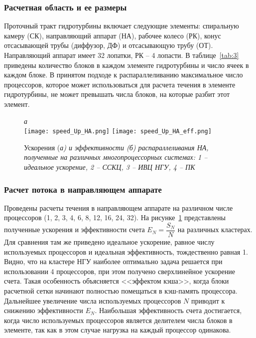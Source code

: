\subsubsection{Расчетная область и ее размеры}
\label{s:1632}
Проточный тракт гидротурбины включает следующие элементы: спиральную камеру (СК), направляющий 
аппарат (НА), рабочее колесо (РК), конус отсасывающей трубы (диффузор, ДФ) и отсасывающую трубу (ОТ). 
Направляющий аппарат имеет 32 лопатки,
РК -- 4 лопасти. В таблице~\ref{tab:3} приведены количество блоков в каждом элементе гидротурбины и число ячеек 
в каждом блоке. В принятом подходе к распараллеливанию максимальное число процессоров, которое может 
использоваться  для расчета течения в элементе гидротурбины, не может превышать числа блоков, на которые 
разбит этот элемент.
\begin{figure}[h!]
  \label{fig1:13}
  \centering\small{\it а}\hspace*{90mm}{\it б}\\
  {\texttt{[image: speed\_Up\_HA.png]}}\hfill
  {\texttt{[image: speed\_Up\_HA\_eff.png]}}
  \caption{Ускорения (\it{а}) и эффективности (\it{б}) распараллеливания НА, полученные на различных 
           многопроцессорных системах: \it{1} -- идеальное ускорение, \it{2} -- ССКЦ, 
           \it{3} -- ИВЦ НГУ, \it{4} -- ПК}
\end{figure}

\subsubsection{Расчет потока в направляющем аппарате}
\label{s:1633}
Проведены расчеты течения в направляющем аппарате на различном числе процессоров 
(1, 2, 3, 4, 6, 8, 12, 16, 24, 32). На рисунке~\ref{fig1:13} представлены полученные ускорения и 
эффективности счета $E_N = \dfrac{S_N}{N}$ на различных кластерах. 
Для сравнения там же приведено идеальное ускорение, равное числу используемых процессоров и идеальная
эффективность, тождественно равная 1. 
Видно, что на кластере НГУ наиболее оптимально задача решается при использовании 4 процессоров, 
при этом получено сверхлинейное ускорение счета. 
Такая особенность объясняется <<эффектом кэша>>, когда блоки расчетной сетки начинают 
полностью помещаться в кэш-память процессора. Дальнейшее увеличение числа используемых процессоров $N$ 
приводит к снижению эффективности $E_N$. Наибольшая эффективность счета достигается, когда число используемых 
процессоров является делителем числа блоков в элементе, так как в этом случае нагрузка на каждый процессор 
одинакова.

